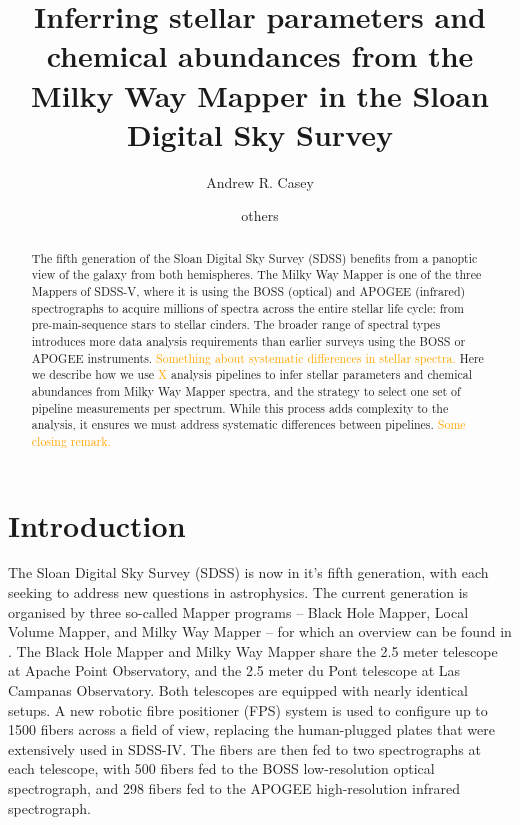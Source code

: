 \documentclass[modern]{aastex631}
\newcommand{\todo}[1]{\textcolor{orange}{#1}}
\begin{document}
\title{Inferring stellar parameters and chemical abundances from the Milky Way Mapper in the Sloan Digital Sky Survey}

\author[0000-0003-0174-0564]{Andrew R. Casey}

\author{others}


\begin{abstract}
\noindent The fifth generation of the Sloan Digital Sky Survey (SDSS) benefits from a panoptic view of the galaxy from both hemispheres.
The Milky Way Mapper is one of the three Mappers of SDSS-V, where it is using the BOSS (optical) and APOGEE (infrared) spectrographs to acquire millions of spectra across the entire stellar life cycle: from pre-main-sequence stars to stellar cinders.
The broader range of spectral types introduces more data analysis requirements than earlier surveys using the BOSS or APOGEE instruments.
\todo{Something about systematic differences in stellar spectra.}
Here we describe how we use \todo{X} analysis pipelines to infer stellar parameters and chemical abundances from Milky Way Mapper spectra, and the strategy to select one set of pipeline measurements per spectrum.
While this process adds complexity to the analysis, it ensures we must address systematic differences between pipelines.
\todo{Some closing remark.}
\end{abstract}



\section*{}\clearpage
\section{Introduction} \label{sec:intro}
The Sloan Digital Sky Survey (SDSS) is now in it's fifth generation, with each seeking to address new questions in astrophysics.
The current generation is organised by three so-called Mapper programs -- Black Hole Mapper, Local Volume Mapper, and Milky Way Mapper -- for which an overview can be found in \citet{kollmeier}.
The Black Hole Mapper and Milky Way Mapper share the 2.5 meter telescope at Apache Point Observatory, and the 2.5 meter du Pont telescope at Las Campanas Observatory.
Both telescopes are equipped with nearly identical setups. A new robotic fibre positioner (FPS) system is used to configure up to 1500 fibers across a field of view, replacing the human-plugged plates that were extensively used in SDSS-IV.
The fibers are then fed to two spectrographs at each telescope, with 500 fibers fed to the BOSS low-resolution optical spectrograph, and 298 fibers fed to the APOGEE high-resolution infrared spectrograph.
\end{document}
